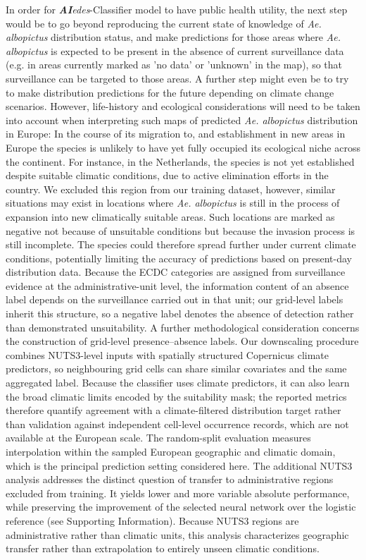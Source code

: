 \documentclass[preprint,12pt]{elsarticle}
\begin{document}
In order for \textit{\textbf{AI}edes}-Classifier model to have public health utility, the next step would be to go beyond reproducing the current state of knowledge of \emph{Ae. albopictus} distribution status, and make predictions for those  areas where \emph{Ae. albopictus} is expected to be present in the absence of current surveillance data (e.g. in areas currently marked as 'no data' or 'unknown' in the map), so that surveillance can be targeted to those areas. A further step might even be to try to make distribution predictions for the future depending on climate change scenarios. However, life-history and ecological considerations will need to be taken into account when interpreting such maps of predicted \textit{Ae. albopictus} distribution in Europe: In the course of its migration to, and establishment in new areas in Europe the species is unlikely to have yet fully occupied its ecological niche across the continent. For instance, in the Netherlands, the species is not yet established despite suitable climatic conditions, due to active elimination efforts in the country. We excluded this region from our training dataset, however, similar situations may exist in locations where \textit{Ae. albopictus} is still in the process of expansion into new climatically suitable areas. Such locations are marked as negative not because of unsuitable conditions but because the invasion process is still incomplete. The species could therefore spread further under current climate conditions, potentially limiting the accuracy of predictions based on present-day distribution data. Because the ECDC categories are assigned from surveillance evidence at the administrative-unit level, the information content of an absence label depends on the surveillance carried out in that unit; our grid-level labels inherit this structure, so a negative label denotes the absence of detection rather than demonstrated unsuitability.
A further methodological consideration concerns the construction of grid-level presence--absence labels. Our downscaling procedure combines NUTS3-level inputs with spatially structured Copernicus climate predictors, so neighbouring grid cells can share similar covariates and the same aggregated label. Because the classifier uses climate predictors, it can also learn the broad climatic limits encoded by the suitability mask; the reported metrics therefore quantify agreement with a climate-filtered distribution target rather than validation against independent cell-level occurrence records, which are not available at the European scale. The random-split evaluation measures interpolation within the sampled European geographic and climatic domain, which is the principal prediction setting considered here. The additional NUTS3 analysis addresses the distinct question of transfer to administrative regions excluded from training. It yields lower and more variable absolute performance, while preserving the improvement of the selected neural network over the logistic reference (see Supporting Information). Because NUTS3 regions are administrative rather than climatic units, this analysis characterizes geographic transfer rather than extrapolation to entirely unseen climatic conditions.
\end{document}
